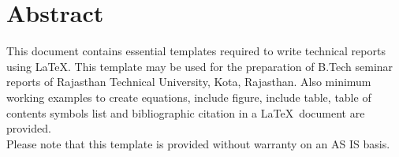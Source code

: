 \chapter*{Abstract}%
%

This document contains essential templates required to write technical
reports using \LaTeX. This template may be used for the preparation of B.Tech seminar reports of Rajasthan Technical University, Kota, Rajasthan. Also minimum working examples to create equations, include figure, include table, table of contents symbols list and bibliographic citation in a \LaTeX\ document are provided.\\

Please note that this template is provided without warranty on an AS IS basis.\\

\thispagestyle{plain}

